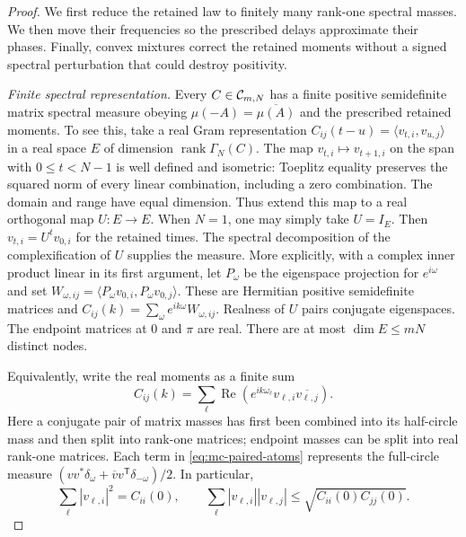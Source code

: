 \begin{proof}
We first reduce the retained law to finitely many rank-one spectral masses. We then move their frequencies so the prescribed delays approximate their phases. Finally, convex mixtures correct the retained moments without a signed spectral perturbation that could destroy positivity.

\emph{Finite spectral representation.}
Every $C\in\mathcal C_{m,N}$ has a finite positive semidefinite matrix spectral
measure obeying $\mu(-A)=\overline{\mu(A)}$ and the prescribed retained
moments. To see this, take a real Gram representation
$C_{ij}(t-u)=\langle v_{t,i},v_{u,j}\rangle$ in a real space $E$ of
dimension $\operatorname{rank}\Gamma_N(C)$. The map
$v_{t,i}\mapsto v_{t+1,i}$ on the span with $0\le t<N-1$ is well defined
and isometric: Toeplitz equality preserves the squared norm of every
linear combination, including a zero combination. The domain and range have equal dimension. Thus extend this map to a
real orthogonal map $U:E\to E$. When $N=1$, one may simply take $U=I_E$. Then
$v_{t,i}=U^t v_{0,i}$ for the retained times. The spectral decomposition
of the complexification of $U$ supplies the measure. More explicitly,
with a complex inner product linear in its first argument, let
$P_\omega$ be the eigenspace projection for $e^{i\omega}$ and set
$W_{\omega,ij}=\langle P_\omega v_{0,i},P_\omega v_{0,j}\rangle$.
These are Hermitian positive semidefinite matrices and
$C_{ij}(k)=\sum_\omega e^{ik\omega}W_{\omega,ij}$.
Realness of $U$ pairs conjugate eigenspaces. The endpoint matrices at
$0$ and $\pi$ are real. There are at most $\dim E\le mN$ distinct nodes.

Equivalently, write the real moments as a finite sum
\begin{equation}\label{eq:mc-paired-atoms}
 C_{ij}(k)=\sum_\ell\operatorname{Re}
                (e^{ik\omega_\ell}v_{\ell,i}\overline{v_{\ell,j}}).
\end{equation}
Here a conjugate pair of matrix masses has first been combined into its
half-circle mass and then split into rank-one matrices; endpoint masses
can be split into real rank-one matrices. Each term in
\eqref{eq:mc-paired-atoms} represents the full-circle measure
$(vv^*\delta_\omega+\overline v v^{\mathsf T}\delta_{-\omega})/2$.
In particular,
\begin{equation}\label{eq:mc-rankone-budget}
 \sum_\ell |v_{\ell,i}|^2=C_{ii}(0),\qquad
 \sum_\ell |v_{\ell,i}||v_{\ell,j}|
 \le\sqrt{C_{ii}(0)C_{jj}(0)}.
\end{equation}


\end{proof}
